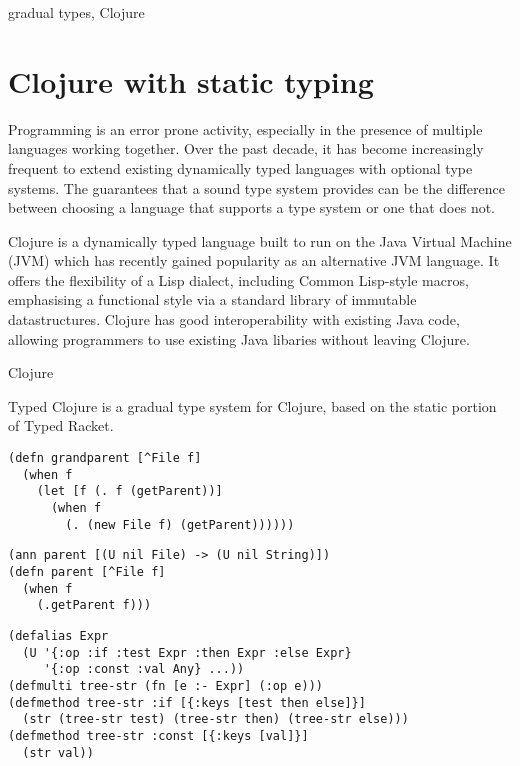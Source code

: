 \documentclass[preprint,9pt]{sigplanconf}
\theoremstyle{remark}
\theoremstyle{remark}
\begin{document}
\keywords
gradual types, Clojure

\section{Clojure with static typing}


Programming is an error prone activity, especially in the presence of
multiple languages working together. Over the past decade, it has become increasingly
frequent to extend existing dynamically typed languages with optional type systems.
The guarantees that a sound type system provides can be the difference between
choosing a language that supports a type system or one that does not.


Clojure is a dynamically typed language built to run on the Java Virtual Machine (JVM)
which has recently gained popularity as an alternative JVM language.
It offers the flexibility of a Lisp dialect, including Common Lisp-style macros,
emphasising a functional style via a standard library of immutable datastructures. 
Clojure has good interoperability with existing Java code, allowing programmers to
use existing Java libaries without leaving Clojure.


Clojure

Typed Clojure is a gradual type system for Clojure, based on the
static portion of Typed Racket.

\begin{lstlisting}
(defn grandparent [^File f]
  (when f
    (let [f (. f (getParent))]
      (when f
        (. (new File f) (getParent))))))
\end{lstlisting}

\begin{lstlisting}
(ann parent [(U nil File) -> (U nil String)])
(defn parent [^File f]
  (when f
    (.getParent f)))
\end{lstlisting}

\begin{lstlisting}
(defalias Expr
  (U '{:op :if :test Expr :then Expr :else Expr}
     '{:op :const :val Any} ...))
(defmulti tree-str (fn [e :- Expr] (:op e)))
(defmethod tree-str :if [{:keys [test then else]}] 
  (str (tree-str test) (tree-str then) (tree-str else)))
(defmethod tree-str :const [{:keys [val]}] 
  (str val))
\end{lstlisting}
\end{document}
